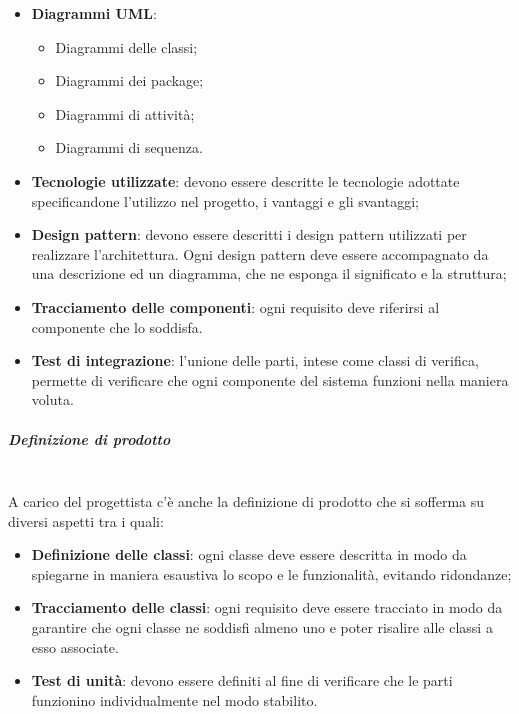 \begin{itemize}
	\item \textbf{Diagrammi UML}:
	\begin{itemize}
		\item Diagrammi delle classi;
		\item Diagrammi dei package;
		\item Diagrammi di attività;
		\item Diagrammi di sequenza.
	\end{itemize}
	\item \textbf{Tecnologie utilizzate}: devono essere descritte le tecnologie adottate specificandone l'utilizzo nel progetto, i vantaggi e gli svantaggi;
	\item \textbf{Design pattern}: devono essere descritti i design pattern utilizzati per realizzare l'architettura. Ogni design pattern deve essere accompagnato da una descrizione ed un diagramma, che ne esponga il significato e la struttura;
	\item \textbf{Tracciamento delle componenti}: ogni requisito deve riferirsi al componente che lo soddisfa.
	\item \textbf{Test di integrazione}: l'unione delle parti, intese come classi di verifica, permette di verificare che ogni componente del sistema funzioni nella maniera voluta.
\end{itemize}
\subparagraph{Definizione di prodotto} \mbox{}\\
A carico del progettista c'è anche la definizione di prodotto che si sofferma su diversi aspetti tra i quali:
\begin{itemize}
	\item \textbf{Definizione delle classi}: ogni classe deve essere descritta in modo da spiegarne in maniera esaustiva lo scopo e le funzionalità, evitando ridondanze;
	\item \textbf{Tracciamento delle classi}: ogni requisito deve essere tracciato in modo da garantire che ogni classe ne soddisfi almeno uno e poter risalire alle classi a esso associate.
	\item \textbf{Test di unità}: devono essere definiti al fine di verificare che le parti funzionino individualmente nel modo stabilito.
\end{itemize}
